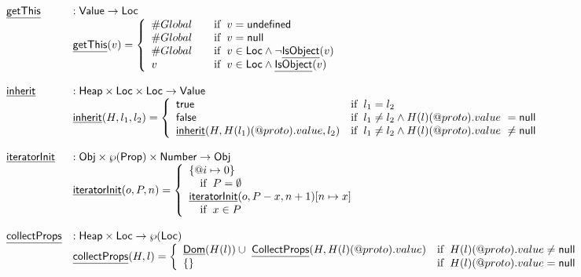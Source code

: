 \documentclass{article}
\makeatletter
\newcommand{\SF}[1]{\mbox{\textsf{#1}}}
\newcommand{\ifc}[1]{{\rm if}\begin{array}[t]{l}#1\end{array}}
\newcommand{\Heap}{\SF{Heap}}
\newcommand{\Loc}{\SF{Loc}}
\newcommand{\Prop}{\SF{Prop}}
\newcommand{\Obj}{\SF{Obj}}
\newcommand{\Value}{\SF{Value}}
\newcommand{\powerset}[1]{\wp(#1)}
\newcommand{\hf}[1]{\underline{\sf #1}}
\newcommand{\varloc}[1]{\##1}
\newcommand{\varprop}[1]{@#1}
\newcommand{\vtrue}{\SF{true}}
\newcommand{\vfalse}{\SF{false}}
\makeatother
\begin{document}
\[
\begin{array}{ll}
\hf{getThis} & : \Value \rightarrow \Loc \\
& \hf{getThis}(v)
  = 
  \left\{
    \begin{array}{l@{\quad\quad}l}
      \varloc{Global} & \ifc{v=\SF{undefined}} \\
      \varloc{Global} & \ifc{v=\SF{null}} \\
      \varloc{Global} & \ifc{v\in\Loc \land \lnot\hf{IsObject}(v)} \\
      v               & \ifc{v\in\Loc \land \hf{IsObject}(v)}\\
    \end{array}
  \right.\\
\\
\hf{inherit} & : \Heap \times \Loc \times \Loc \rightarrow \Value \\
& \hf{inherit}(H,l_1,l_2) = \left\{
  \begin{array}{ll}
    \vtrue & \ifc{l_1 = l_2} \\
    \vfalse & \ifc{l_1 \neq l_2 \land H(l)(\varprop{proto}).value\ = \SF{null}} \\
    \hf{inherit}(H,H(l_1)(\varprop{proto}).value,l_2) & \ifc{l_1 \neq l_2 \land H(l)(\varprop{proto}).value\ \neq \SF{null}} \\
  \end{array}
  \right.\\
\\
\hf{iteratorInit} & : \Obj \times \powerset{\Prop} \times \SF{Number} \rightarrow \Obj \\
& \hf{iteratorInit}(o,P,n) = 
  \left\{
  \begin{array}{l}
    \{\varprop{i}\mapsto 0\} \\\quad\ifc{P = \emptyset} \\
    \hf{iteratorInit}(o,P-x,n+1)[n\mapsto x] \\\quad \ifc{x\in P} \\
  \end{array}
  \right.\\
\\
\hf{collectProps} & : \Heap \times \Loc \rightarrow \powerset{\Loc} \\
& \hf{collectProps}(H,l) = 
  \left\{
  \begin{array}{ll}
    \hf{Dom}(H(l)) \cup\ \hf{CollectProps}(H,H(l)(\varprop{proto}).value)
    & \ifc{H(l)(\varprop{proto}).value \neq \SF{null}} \\
    \{\} & \ifc{H(l)(\varprop{proto}).value = \SF{null}} \\
  \end{array}
  \right.\\
\\
\end{array}
\]
\end{document}
